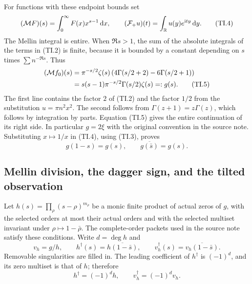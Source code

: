 For functions with these endpoint bounds set
\begin{equation}
 (\mathcal M F)(s)=\int_0^\infty F(x)x^{s-1}\,\mathrm d x,
 \qquad (\mathcal F_+u)(t)=\int_{\mathbb R}u(y)e^{\mathrm i ty}\,\mathrm d y.
 \tag{TI.4}
\end{equation}
The Mellin integral is entire. When $\Re s>1$, the sum of the absolute
integrals of the terms in (TI.2) is finite, because it is bounded by a
constant depending on $s$ times $\sum n^{-\Re s}$. Thus
\begin{align}
 (\mathcal M f_0)(s)
 &=\pi^{-s/2}\zeta(s)
 \left(4\Gamma(s/2+2)-6\Gamma(s/2+1)\right)\notag\\
 &=s(s-1)\pi^{-s/2}\Gamma(s/2)\zeta(s)=:g(s). \tag{TI.5}
\end{align}
The first line contains the factor $2$ of (TI.2) and the factor $1/2$
from the substitution $u=\pi n^2x^2$. The second follows from
$\Gamma(z+1)=z\Gamma(z)$, which follows by integration by parts.
Equation (TI.5) gives the entire continuation of its right side. In
particular $g=2\xi$ with the original convention in the source note.
Substituting $x\mapsto1/x$ in (TI.4), using (TI.3), proves
\begin{equation}
 g(1-s)=g(s),\qquad \overline{g(\bar s)}=g(s).
 \tag{TI.6}
\end{equation}

\subsection{Mellin division, the dagger sign, and the tilted observation}

Let $h(s)=\prod_\rho(s-\rho)^{m_\rho}$ be a monic finite product of
actual zeros of $g$, with the selected orders at most their actual
orders and with the selected multiset invariant under
$\rho\mapsto1-\bar\rho$. The complete-order packets used in the source
note satisfy these conditions. Write $d=\deg h$ and
\begin{equation}
 v_h=g/h,\qquad h^\dagger(s)=\overline{h(1-\bar s)},\qquad
 v_h^\dagger(s)=\overline{v_h(1-\bar s)}.
 \tag{TI.7}
\end{equation}
Removable singularities are filled in. The leading coefficient of
$h^\dagger$ is $(-1)^d$, and its zero multiset is that of $h$; therefore
\begin{equation}
 h^\dagger=(-1)^d h,\qquad v_h^\dagger=(-1)^d v_h.
 \tag{TI.8}
\end{equation}

